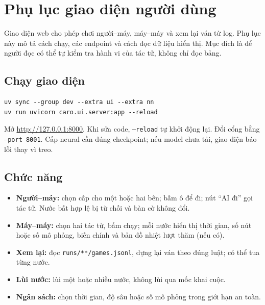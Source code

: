 \chapter{Phụ lục giao diện người dùng}
\label{app:ui}

Giao diện web cho phép chơi người--máy, máy--máy và xem lại ván từ log. Phụ lục này mô tả cách
chạy, các endpoint và cách đọc dữ liệu hiển thị. Mục đích là để người đọc có thể tự kiểm tra
hành vi của tác tử, không chỉ đọc bảng.

\section{Chạy giao diện}
\begin{lstlisting}[numbers=none]
uv sync --group dev --extra ui --extra nn
uv run uvicorn caro.ui.server:app --reload
\end{lstlisting}
Mở \url{http://127.0.0.1:8000}. Khi sửa code, \texttt{--reload} tự khởi động lại. Đổi cổng bằng
\texttt{--port 8001}. Cấp neural cần đúng checkpoint; nếu model chưa tải, giao diện báo lỗi
thay vì treo.

\section{Chức năng}
\begin{itemize}
  \item \textbf{Người--máy:} chọn cấp cho một hoặc hai bên; bấm ô để đi; nút ``AI đi'' gọi tác
        tử. Nước bất hợp lệ bị từ chối và bàn cờ không đổi.
  \item \textbf{Máy--máy:} chọn hai tác tử, bấm chạy; mỗi nước hiển thị thời gian, số nút hoặc
        số mô phỏng, biến chính và bản đồ nhiệt lượt thăm (nếu có).
  \item \textbf{Xem lại:} đọc \texttt{runs/**/games.jsonl}, dựng lại ván theo đúng luật; có thể
        tua từng nước.
  \item \textbf{Lùi nước:} lùi một hoặc nhiều nước, không lùi qua mốc khai cuộc.
  \item \textbf{Ngân sách:} chọn thời gian, độ sâu hoặc số mô phỏng trong giới hạn an toàn.
\end{itemize}

